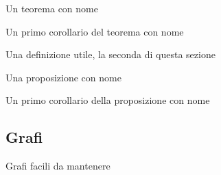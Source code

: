\begin{theorem}
    Un teorema con nome
\end{theorem}

\begin{corollario}
    Un primo corollario del teorema con nome
\end{corollario}

\begin{definition}
    Una definizione utile, la seconda di questa sezione
\end{definition}

\begin{proposizione}
    Una proposizione con nome
\end{proposizione}

\begin{corollario}
    Un primo corollario della proposizione con nome
\end{corollario}

\subsection{Grafi}

Grafi facili da mantenere


